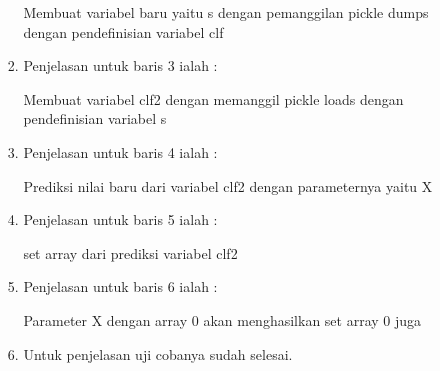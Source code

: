 \begin{itemize}
\begin{itemize}
\begin{enumerate}
\par Membuat variabel baru yaitu s dengan pemanggilan pickle dumps dengan pendefinisian variabel clf
\par
\item Penjelasan untuk baris 3  ialah :
\par Membuat variabel clf2 dengan memanggil pickle loads dengan pendefinisian variabel s
\par
\item Penjelasan untuk baris 4  ialah :
\par Prediksi nilai baru dari variabel clf2 dengan parameternya yaitu X
\par
\item Penjelasan untuk baris 5  ialah :
\par set array dari prediksi variabel clf2
\par
\item Penjelasan untuk baris 6 ialah : 
\par Parameter X dengan array 0 akan menghasilkan set array 0 juga
\par
\par
\item Untuk penjelasan uji cobanya sudah selesai.
\par
\end{enumerate}
\end{itemize}
\end{itemize}


